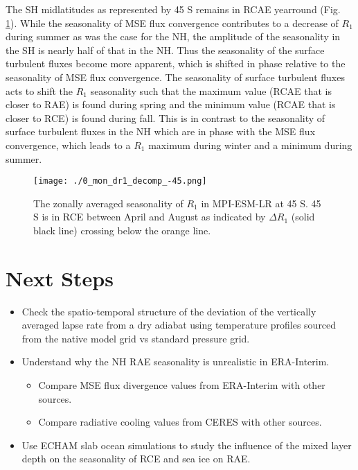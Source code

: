 \documentclass[11pt]{article}
\begin{document}
The SH midlatitudes as represented by 45 S remains in RCAE yearround (Fig. \ref{fig:org7ae0565}). While the seasonality of MSE flux convergence contributes to a decrease of \(R_1\) during summer as was the case for the NH, the amplitude of the seasonality in the SH is nearly half of that in the NH. Thus the seasonality of the surface turbulent fluxes become more apparent, which is shifted in phase relative to the seasonality of MSE flux convergence. The seasonality of surface turbulent fluxes acts to shift the \(R_1\) seasonality such that the maximum value (RCAE that is closer to RAE) is found during spring and the minimum value (RCAE that is closer to RCE) is found during fall. This is in contrast to the seasonality of surface turbulent fluxes in the NH which are in phase with the MSE flux convergence, which leads to a \(R_1\) maximum during winter and a minimum during summer.

\begin{figure}[htbp]
\centering
\texttt{[image: ./0\_mon\_dr1\_decomp\_-45.png]}
\caption{\label{fig:org7ae0565}The zonally averaged seasonality of \(R_1\) in MPI-ESM-LR at 45 S. 45 S is in RCE between April and August as indicated by \(\Delta R_1\) (solid black line) crossing below the orange line.}
\end{figure}

\section{Next Steps}
\label{sec:org0bd8349}
\begin{itemize}
\item Check the spatio-temporal structure of the deviation of the vertically averaged lapse rate from a dry adiabat using temperature profiles sourced from the native model grid vs standard pressure grid.
\item Understand why the NH RAE seasonality is unrealistic in ERA-Interim.
\begin{itemize}
\item Compare MSE flux divergence values from ERA-Interim with other sources.
\item Compare radiative cooling values from CERES with other sources.
\end{itemize}
\item Use ECHAM slab ocean simulations to study the influence of the mixed layer depth on the seasonality of RCE and sea ice on RAE.
\end{itemize}



\end{document}
